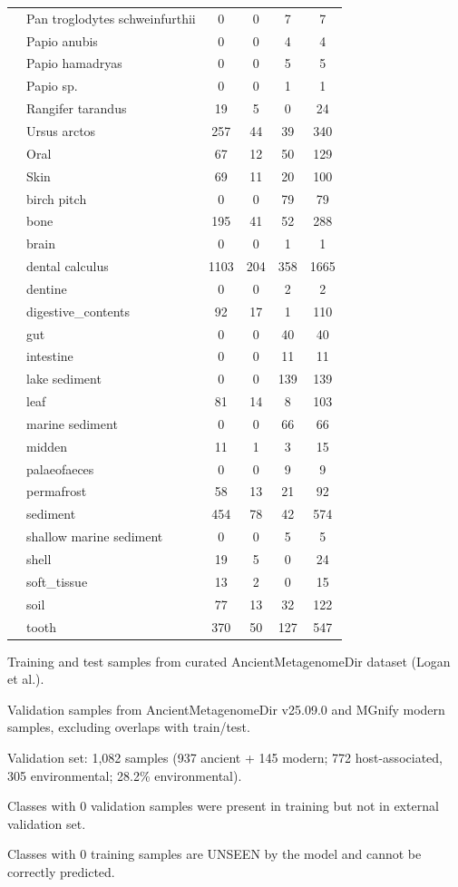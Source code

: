 \begin{table}[!t]
\begin{tabular*}{\textwidth}{@{\extracolsep{\fill}}llcccc@{\extracolsep{\fill}}}
 & Pan troglodytes schweinfurthii & 0 & 0 & 7 & 7 \\
 & Papio anubis & 0 & 0 & 4 & 4 \\
 & Papio hamadryas & 0 & 0 & 5 & 5 \\
 & Papio sp. & 0 & 0 & 1 & 1 \\
 & Rangifer tarandus & 19 & 5 & 0 & 24 \\
 & Ursus arctos & 257 & 44 & 39 & 340 \\
\addlinespace
\multirow{22}{*}{Material} & Oral & 67 & 12 & 50 & 129 \\
 & Skin & 69 & 11 & 20 & 100 \\
 & birch pitch & 0 & 0 & 79 & 79 \\
 & bone & 195 & 41 & 52 & 288 \\
 & brain & 0 & 0 & 1 & 1 \\
 & dental calculus & 1103 & 204 & 358 & 1665 \\
 & dentine & 0 & 0 & 2 & 2 \\
 & digestive\_contents & 92 & 17 & 1 & 110 \\
 & gut & 0 & 0 & 40 & 40 \\
 & intestine & 0 & 0 & 11 & 11 \\
 & lake sediment & 0 & 0 & 139 & 139 \\
 & leaf & 81 & 14 & 8 & 103 \\
 & marine sediment & 0 & 0 & 66 & 66 \\
 & midden & 11 & 1 & 3 & 15 \\
 & palaeofaeces & 0 & 0 & 9 & 9 \\
 & permafrost & 58 & 13 & 21 & 92 \\
 & sediment & 454 & 78 & 42 & 574 \\
 & shallow marine sediment & 0 & 0 & 5 & 5 \\
 & shell & 19 & 5 & 0 & 24 \\
 & soft\_tissue & 13 & 2 & 0 & 15 \\
 & soil & 77 & 13 & 32 & 122 \\
 & tooth & 370 & 50 & 127 & 547 \\
\bottomrule
\end{tabular*}
\begin{tablenotes}
\item Training and test samples from curated AncientMetagenomeDir dataset (Logan et al.).
\item Validation samples from AncientMetagenomeDir v25.09.0 and MGnify modern samples, excluding overlaps with train/test.
\item Validation set: 1,082 samples (937 ancient + 145 modern; 772 host-associated, 305 environmental; 28.2\% environmental).
\item Classes with 0 validation samples were present in training but not in external validation set.
\item Classes with 0 training samples are UNSEEN by the model and cannot be correctly predicted.
\end{tablenotes}
\end{table}